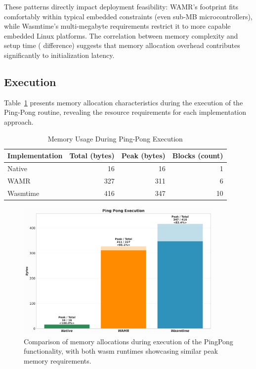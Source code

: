 These patterns directly impact deployment feasibility: WAMR's  footprint fits comfortably within typical embedded constraints (even sub-MB microcontrollers), while Wasmtime's multi-megabyte requirements restrict it to more capable embedded Linux platforms. The correlation between memory complexity and setup time ( difference) suggests that memory allocation overhead contributes significantly to initialization latency.

\subsection{Execution}

Table~\ref{tab:memory-execution} presents memory allocation characteristics during the execution of the Ping-Pong routine, revealing the resource requirements for each implementation approach.

\begin{table}[H]
    \centering
    \caption{Memory Usage During Ping-Pong Execution}
    \label{tab:memory-execution}
    \begin{tabular}{lrrr}
        \toprule
        \textbf{Implementation} & \textbf{Total (bytes)} & \textbf{Peak (bytes)} & \textbf{Blocks (count)} \\
        \midrule
        Native        & 16   & 16  & 1 \\
        WAMR          & 327  & 311 & 6 \\
        Wasmtime      & 416  & 347 & 10 \\
        \bottomrule
    \end{tabular}
\end{table}

\begin{figure}[H]
    \centering
    \includegraphics[width=0.9\textwidth]{images/mem_execution_all.png}
    \caption{Comparison of memory allocations during execution of the PingPong functionality, with both \acrshort{wasm} runtimes showcasing similar peak memory requirements.}
    \label{fig:mem_pingpong}
\end{figure}

